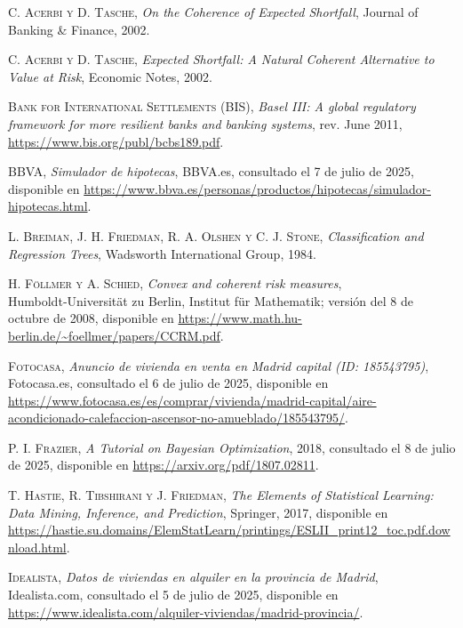 \documentclass[11pt]{book}
\theoremstyle{plain} %
\theoremstyle{definition} %
\begin{document}
\begin{thebibliography}{99}

\textsc{C. Acerbi y D. Tasche},  
\textit{On the Coherence of Expected Shortfall},  
Journal of Banking \& Finance, 2002.

\textsc{C. Acerbi y D. Tasche},  
\textit{Expected Shortfall: A Natural Coherent Alternative to Value at Risk},  
Economic Notes, 2002.

\textsc{Bank for International Settlements (BIS)},
\textit{Basel III: A global regulatory framework for more resilient banks and banking systems}, 
rev. June 2011,
\url{https://www.bis.org/publ/bcbs189.pdf}.


\textsc{BBVA},
\textit{Simulador de hipotecas},
BBVA.es, consultado el 7 de julio de 2025, disponible en
\url{https://www.bbva.es/personas/productos/hipotecas/simulador-hipotecas.html}.

\textsc{L. Breiman, J. H. Friedman, R. A. Olshen y C. J. Stone},  
\textit{Classification and Regression Trees},  
Wadsworth International Group, 1984.


\textsc{H. Föllmer y A. Schied},
\textit{Convex and coherent risk measures}, 
Humboldt‑Universität zu Berlin, Institut für Mathematik;  
versión del 8 de octubre de 2008, disponible en  
\url{https://www.math.hu-berlin.de/~foellmer/papers/CCRM.pdf}.



\textsc{Fotocasa},  
\textit{Anuncio de vivienda en venta en Madrid capital (ID: 185543795)},  
Fotocasa.es, consultado el 6 de julio de 2025, disponible en  
\url{https://www.fotocasa.es/es/comprar/vivienda/madrid-capital/aire-acondicionado-calefaccion-ascensor-no-amueblado/185543795/}.



\textsc{P. I. Frazier},  
\textit{A Tutorial on Bayesian Optimization},  
2018, consultado el 8 de julio de 2025, disponible en  
\url{https://arxiv.org/pdf/1807.02811}.



\textsc{T. Hastie, R. Tibshirani y J. Friedman},  
\textit{The Elements of Statistical Learning: Data Mining, Inference, and Prediction}, Springer, 2017,  
disponible en \url{https://hastie.su.domains/ElemStatLearn/printings/ESLII_print12_toc.pdf.download.html}.


\textsc{Idealista},
\textit{Datos de viviendas en alquiler en la provincia de Madrid},
Idealista.com, consultado el 5 de julio de 2025, disponible en  
\url{https://www.idealista.com/alquiler-viviendas/madrid-provincia/}.


\end{thebibliography}
\end{document}
